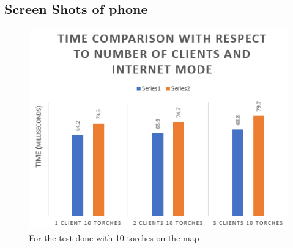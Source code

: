 \documentclass[12pt,a4paper,twoside]{report}
\begin{document}
\begin{thebibliography}{widestlabel}
 \subsection{Screen Shots of phone}
  \begin{figure}[htps]
     \centering
     \includegraphics[width=0.5\linewidth]{tc3.png}
     \caption{For the test done with 10 torches on the map}
     \label{10torch}
 \end{figure}


\end{thebibliography}



\end{document}
